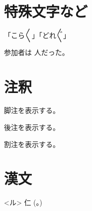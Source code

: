 \documentclass[ %
    uplatex, %
    tate, %
    hanging_punctuation, %
    paper=b6, %
    reference_mark=interlinear, %
    book %
]{jlreq}
\begin{document}
\section{特殊文字など}

     
     
     
     

     
     
     
     

     
     
     
     


「こら〳〵」「どれ〴〵」

参加者は\,\,人だった。


\section{注釈}

脚注を表示する。

後注を表示する。

割注を表示する。


\section{漢文}


<ル>
仁
(。)
\end{document}
